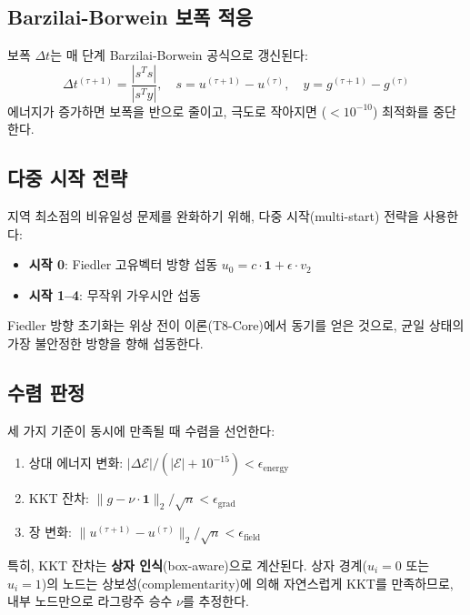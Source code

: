 \subsection{Barzilai-Borwein 보폭 적응}

보폭 $\Delta t$는 매 단계 Barzilai-Borwein 공식으로 갱신된다:
\begin{equation}
    \Delta t^{(\tau+1)} = \frac{|s^T s|}{|s^T y|}, \quad s = u^{(\tau+1)} - u^{(\tau)}, \quad y = g^{(\tau+1)} - g^{(\tau)}
\end{equation}
에너지가 증가하면 보폭을 반으로 줄이고, 극도로 작아지면 ($< 10^{-10}$) 최적화를 중단한다.

\subsection{다중 시작 전략}

지역 최소점의 비유일성 문제를 완화하기 위해, 다중 시작(multi-start) 전략을 사용한다:
\begin{itemize}
    \item \textbf{시작 0}: Fiedler 고유벡터 방향 섭동 $u_0 = c \cdot \mathbf{1} + \epsilon \cdot v_2$
    \item \textbf{시작 1--4}: 무작위 가우시안 섭동
\end{itemize}
Fiedler 방향 초기화는 위상 전이 이론(T8-Core)에서 동기를 얻은 것으로, 균일 상태의 가장 불안정한 방향을 향해 섭동한다.

\subsection{수렴 판정}

세 가지 기준이 동시에 만족될 때 수렴을 선언한다:
\begin{enumerate}
    \item 상대 에너지 변화: $|\Delta \mathcal{E}| / (|\mathcal{E}| + 10^{-15}) < \epsilon_{\mathrm{energy}}$
    \item KKT 잔차: $\|g - \nu \cdot \mathbf{1}\|_2 / \sqrt{n} < \epsilon_{\mathrm{grad}}$
    \item 장 변화: $\|u^{(\tau+1)} - u^{(\tau)}\|_2 / \sqrt{n} < \epsilon_{\mathrm{field}}$
\end{enumerate}

특히, KKT 잔차는 \textbf{상자 인식}(box-aware)으로 계산된다. 상자 경계($u_i = 0$ 또는 $u_i = 1$)의 노드는 상보성(complementarity)에 의해 자연스럽게 KKT를 만족하므로, 내부 노드만으로 라그랑주 승수 $\nu$를 추정한다.


